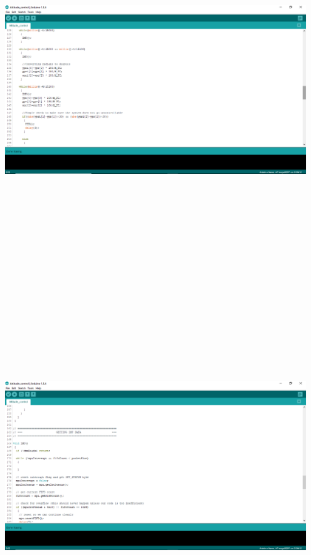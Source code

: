 \documentclass[9pt]{article}
\begin{document}
\begin{flushleft}
\newpage
\includegraphics[width=175mm,height=165mm]{27.jpg}
\newpage
\includegraphics[width=175mm,height=165mm]{28.jpg}

\end{flushleft}
\end{document}
